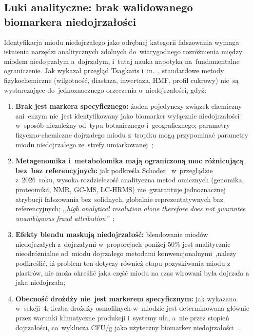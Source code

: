 \subsection{Luki analityczne: brak walidowanego biomarkera niedojrzałości}

Identyfikacja miodu niedojrzałego jako odrębnej kategorii
fałszowania wymaga istnienia narzędzi analitycznych zdolnych
do~wiarygodnego rozróżnienia między miodem niedojrzałym
a~dojrzałym, i~tutaj nauka napotyka na~fundamentalne
ograniczenie. Jak wykazał przegląd Tsagkaris i~in.~\cite{tsagkaris2021},
standardowe metody fizykochemiczne (wilgotność, diastaza,
inwertaza, HMF, profil cukrowy) nie~są wystarczające
do~jednoznacznego orzeczenia o~niedojrzałości, gdyż:

\begin{enumerate}
    \item \textbf{Brak jest markera specyficznego:}
          żaden pojedynczy związek chemiczny ani~enzym
          nie~jest identyfikowany jako biomarker wyłącznie
          niedojrzałości w~sposób niezależny od~typu
          botanicznego i~geograficznego; parametry
          fizyczno-chemiczne dojrzałego miodu z~tropiku
          mogą przypominać parametry miodu niedojrzałego
          ze~strefy umiarkowanej~\cite{tsagkaris2021,guo2020};
    \item \textbf{Metagenomika i~metabolomika mają ograniczoną
          moc różnicującą bez~baz referencyjnych:}
          jak podkreśla Schoder~\cite{schoder2026}
          w~przeglądzie z~2026~roku, wysoka rozdzielczość
          analityczna metod omicznych (genomika, proteomika,
          NMR, GC-MS, LC-HRMS) nie~gwarantuje jednoznacznej
          atrybucji fałszowania bez~solidnych, globalnie
          reprezentatywnych baz referencyjnych; \textit{,,high
          analytical resolution alone therefore does not
          guarantee unambiguous fraud attribution''}~\cite{schoder2026};
    \item \textbf{Efekty blendu maskują niedojrzałość:}
          blendowanie miodów niedojrzałych z~dojrzałymi
          w~proporcjach poniżej 50\% jest analitycznie
          nieodróżnialne od~miodu dojrzałego metodami
          konwencjonalnymi~\cite{schoder2026},należy podkreślić, iż problem ten dotyczy również etapu pozyskiwania miodu z plastrów, nie moża określić jaka część miodu na czas wirowani była dojrzała a jaka niedojrzała;
    \item \textbf{Obecność drożdży nie~jest markerem
          specyficznym:} jak wykazano w~sekcji~4,
          liczba drożdży osmofilnych w~miodzie jest
          determinowana głównie przez warunki klimatyczne
          produkcji i~systemy ula, a~nie przez stopień
          dojrzałości, co~wyklucza CFU/g jako
          użyteczny biomarker niedojrzałości~\cite{rodriguezmachado2024,schoder2026}.
\end{enumerate}


